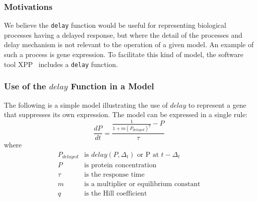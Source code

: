 \documentclass[10pt,twocolumntoc]{cekarticle}
\newcommand{\D}{\displaystyle}
\begin{document}
\subsubsection{Motivations}
\label{sec:delaydiscuss}

We believe the \texttt{delay} function would be useful for representing
biological processes having a delayed response, but where the detail of the
processes and delay mechanism is not relevant to the operation of a given
model.  An example of such a process is gene expression.  To facilitate
this kind of model, the software tool XPP~\citep{ermentrout:2001} includes
a \texttt{delay} function.


\subsubsection{Use of the $delay$ Function in a Model}
\label{sec:delayeg}

The following is a simple model illustrating the use of $delay$ to
represent a gene that suppresses its own expression.  The model can be
expressed in a single rule:
\begin{equation*}
\frac{d P}{d t} = \D\frac{ \D\frac{1}{1 + m (P_{delayed})^q} - P }{ \tau }
\end{equation*}
where
\begin{equation*}
\begin{array}{rl}
P_{delayed} & \mbox{is } delay(P, \Delta_t) \mbox{ or P at } t - \Delta_t\\
P & \mbox{is protein concentration}\\
\tau & \mbox{is the response time}\\
m & \mbox{is a multiplier or equilibrium constant}\\
q & \mbox{is the Hill coefficient}\\ 
\end{array}
\end{equation*}
\end{document}
